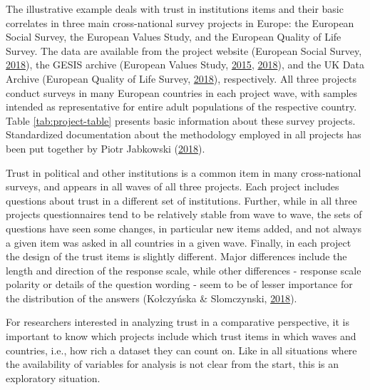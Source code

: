 \documentclass[12pt,]{article}
\begin{document}
The illustrative example deals with trust in institutions items and their basic correlates in three main cross-national survey projects in Europe: the European Social Survey, the European Values Study, and the European Quality of Life Survey. The data are available from the project website (European Social Survey, \protect\hyperlink{ref-ESS2018}{2018}), the GESIS archive (European Values Study, \protect\hyperlink{ref-EVS2015}{2015}, \protect\hyperlink{ref-EVS2018}{2018}), and the UK Data Archive (European Quality of Life Survey, \protect\hyperlink{ref-EQLS2018}{2018}), respectively. All three projects conduct surveys in many European countries in each project wave, with samples intended as representative for entire adult populations of the respective country. Table \ref{tab:project-table} presents basic information about these survey projects. Standardized documentation about the methodology employed in all projects has been put together by Piotr Jabkowski (\protect\hyperlink{ref-Jabkowski2018}{2018}).

Trust in political and other institutions is a common item in many cross-national surveys, and appears in all waves of all three projects. Each project includes questions about trust in a different set of institutions. Further, while in all three projects questionnaires tend to be relatively stable from wave to wave, the sets of questions have seen some changes, in particular new items added, and not always a given item was asked in all countries in a given wave. Finally, in each project the design of the trust items is slightly different. Major differences include the length and direction of the response scale, while other differences - response scale polarity or details of the question wording - seem to be of lesser importance for the distribution of the answers (Kołczyńska \& Slomczynski, \protect\hyperlink{ref-KolczynskaSlomczynski2018}{2018}).

For researchers interested in analyzing trust in a comparative perspective, it is important to know which projects include which trust items in which waves and countries, i.e., how rich a dataset they can count on. Like in all situations where the availability of variables for analysis is not clear from the start, this is an exploratory situation.
\end{document}
